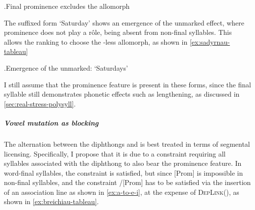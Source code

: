 \ex.\label{ex:sadwrn-tableau}Final prominence excludes the \ipa{[ə]} allomorph\\

The suffixed form \ipa{[saˈdərne]} `Saturday' shows an emergence of the unmarked effect, where prominence does not play a rôle, being absent from non-final syllables. This allows the ranking  to choose the \ipa{[u]}-less allomorph, as shown in \ref{ex:sadyrnau-tableau}

\ex.\label{ex:sadyrnau-tableau}Emergence of the unmarked: \ipa{[saˈdərne]} `Saturdays'\\

I still assume that the prominence feature is present in these forms, since the final syllable still demonstrates phonetic effects such as lengthening, as discussed in \cref{sec:real-stress-polysyll}.


\subparagraph{Vowel mutation as blocking}
\label{sec:vowel-mutation-as-1}

The alternation between the diphthongs \ipa{[ai]} and \ipa{[ei]} is best treated in terms of segmental licensing. Specifically, I propose that it is due to a constraint requiring all syllables associated with the diphthong \ipa{[ai]} to also bear the prominence feature. In word-final syllables, the constraint is satisfied, but since [Prom] is impossible in non\hyp final syllables, and the constraint \ipa{[ai]}/[Prom] has to be satisfied via the insertion of an association line as shown in \ref{ex:a-to-e-i}, at the expense of \textsc{DepLink}(), as shown in \ref{ex:breichiau-tableau}.

